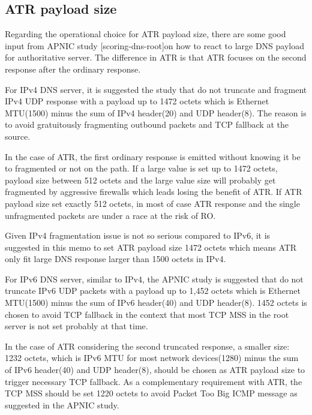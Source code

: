 

   \subsection{ATR payload size}
      Regarding the operational choice for ATR payload size, there are some
   good input from APNIC study [scoring-dns-root]on how to react to
   large DNS payload for authoritative server.  The difference in ATR is
   that ATR focuses on the second response after the ordinary response.

   For IPv4 DNS server, it is suggested the study that do not truncate
   and fragment IPv4 UDP response with a payload up to 1472 octets which
   is Ethernet MTU(1500) minus the sum of IPv4 header(20) and UDP
   header(8).  The reason is to avoid gratuitously fragmenting outbound
   packets and TCP fallback at the source.

   In the case of ATR, the first ordinary response is emitted without
   knowing it be to fragmented or not on the path.  If a large value is
   set up to 1472 octets, payload size between 512 octets and the large
   value size will probably get fragmented by aggressive firewalls which
   leads losing the benefit of ATR.  If ATR payload size set exactly 512
   octets, in most of case ATR response and the single unfragmented
   packets are under a race at the risk of RO.

   Given IPv4 fragmentation issue is not so serious compared to IPv6, it
   is suggested in this memo to set ATR payload size 1472 octets which
   means ATR only fit large DNS response larger than 1500 octets in
   IPv4.

   For IPv6 DNS server, similar to IPv4, the APNIC study is suggested
   that do not truncate IPv6 UDP packets with a payload up to 1,452
   octets which is Ethernet MTU(1500) minus the sum of IPv6 header(40)
   and UDP header(8). 1452 octets is chosen to avoid TCP fallback in the
   context that most TCP MSS in the root server is not set probably at
   that time.

   In the case of ATR considering the second truncated response, a
   smaller size: 1232 octets, which is IPv6 MTU for most network
   devices(1280) minus the sum of IPv6 header(40) and UDP header(8),
   should be chosen as ATR payload size to trigger necessary TCP
   fallback.  As a complementary requirement with ATR, the TCP MSS
   should be set 1220 octets to avoid Packet Too Big ICMP message as
   suggested in the APNIC study.

